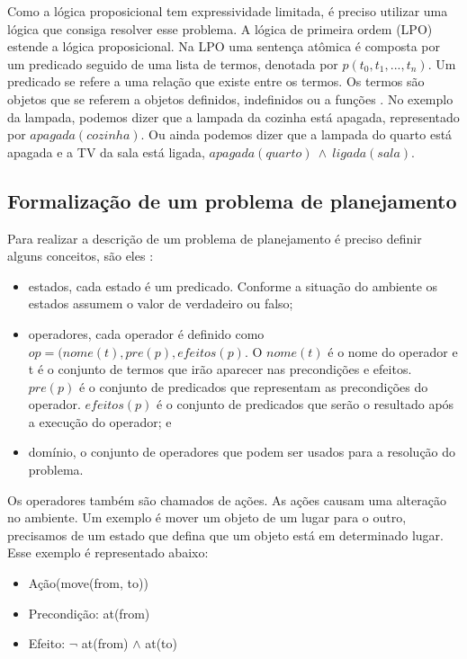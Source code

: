 Como a lógica proposicional tem expressividade limitada, é preciso utilizar uma lógica que consiga resolver esse problema. A lógica de primeira ordem (LPO) estende a lógica proposicional. Na LPO uma sentença atômica é composta por um predicado seguido de uma lista de termos, denotada por $p(t_{0}, t_{1}, ..., t_{n})$. Um predicado se refere a uma relação que existe entre os termos. Os termos são objetos que se referem a objetos definidos, indefinidos ou a funções \cite{intelligence2003modern}. No exemplo da lampada, podemos dizer que a lampada da cozinha está apagada, representado por $apagada(cozinha)$. Ou ainda podemos dizer que a lampada do quarto está apagada e a TV da sala está ligada, $apagada(quarto)~ \wedge~ ligada(sala)$.  

\subsection{Formalização de um problema de planejamento}

Para realizar a descrição de um problema de planejamento é preciso definir alguns conceitos, são eles \cite{intelligence2003modern, ghallab2004automated, meneguzzi2015planning}:

\begin{itemize}
	\item estados, cada estado é um predicado. Conforme a situação do ambiente os estados assumem o valor de verdadeiro ou falso;	 	
	\item operadores, cada operador é definido como $op = (nome(t), pre(p), efeitos(p)$. O $nome(t)$ é o nome do operador e t é o conjunto de termos que irão aparecer nas precondições e efeitos. $pre(p)$ é o conjunto de predicados que representam as precondições do operador. $efeitos(p)$ é o conjunto de predicados que serão o resultado após a execução do operador; e
	\item domínio, o conjunto de operadores que podem ser usados para a resolução do problema.
\end{itemize}

Os operadores também são chamados de ações. As ações causam uma alteração no ambiente. Um exemplo é mover um objeto de um lugar para o outro, precisamos de um estado que defina que um objeto está em determinado lugar. Esse exemplo é representado abaixo:

\begin{itemize}
	\item Ação(move(from, to))
	\item Precondição: at(from)
	\item Efeito: $\neg$ at(from) $\wedge$ at(to)
\end{itemize}

